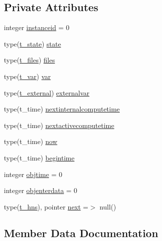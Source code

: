 \subsection*{Private Attributes}
\begin{DoxyCompactItemize}
\item 
integer \mbox{\hyperlink{structmodulehns_1_1t__hns_afb7f2aea4ed6bdb173082764348c3f3f}{instanceid}} = 0
\item 
type(\mbox{\hyperlink{structmodulehns_1_1t__state}{t\+\_\+state}}) \mbox{\hyperlink{structmodulehns_1_1t__hns_a744f2f0d643525daa0f12af54d3d419b}{state}}
\item 
type(\mbox{\hyperlink{structmodulehns_1_1t__files}{t\+\_\+files}}) \mbox{\hyperlink{structmodulehns_1_1t__hns_ac05e7f8c446ac0249116095f3e8f4dee}{files}}
\item 
type(\mbox{\hyperlink{structmodulehns_1_1t__var}{t\+\_\+var}}) \mbox{\hyperlink{structmodulehns_1_1t__hns_a935a8e5ca76e6de08ebea758a4eb2c7d}{var}}
\item 
type(\mbox{\hyperlink{structmodulehns_1_1t__external}{t\+\_\+external}}) \mbox{\hyperlink{structmodulehns_1_1t__hns_acc78c51d5a07a1d57ec6e3b37e5ada84}{externalvar}}
\item 
type(t\+\_\+time) \mbox{\hyperlink{structmodulehns_1_1t__hns_a21e77a24fa3e6dfd9d1df8dfdbca7145}{nextinternalcomputetime}}
\item 
type(t\+\_\+time) \mbox{\hyperlink{structmodulehns_1_1t__hns_aa563ad9727c98aa10bd30f502e88924a}{nextactivecomputetime}}
\item 
type(t\+\_\+time) \mbox{\hyperlink{structmodulehns_1_1t__hns_a10486f851e4a621ddc8fcc9ea05a8f6e}{now}}
\item 
type(t\+\_\+time) \mbox{\hyperlink{structmodulehns_1_1t__hns_a23493f61df5506aaba7d7a7c6a953290}{begintime}}
\item 
integer \mbox{\hyperlink{structmodulehns_1_1t__hns_ab66a9b38ccf902b40d789aaa676a315b}{objtime}} = 0
\item 
integer \mbox{\hyperlink{structmodulehns_1_1t__hns_a02f0e0e78a853d0b9580069be9a8939f}{objenterdata}} = 0
\item 
type(\mbox{\hyperlink{structmodulehns_1_1t__hns}{t\+\_\+hns}}), pointer \mbox{\hyperlink{structmodulehns_1_1t__hns_ae9b13d2d18fec705917c551a36d838d0}{next}} =$>$ null()
\end{DoxyCompactItemize}


\subsection{Member Data Documentation}
\mbox{\label{structmodulehns_1_1t__hns_a23493f61df5506aaba7d7a7c6a953290}} 
